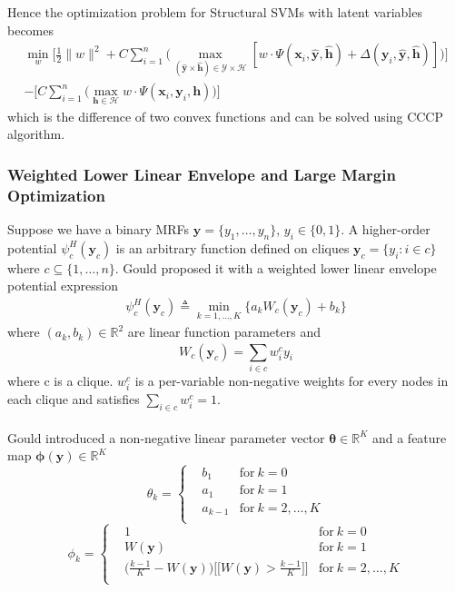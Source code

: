 \documentclass{article}
\begin{document}
		Hence the optimization problem for Structural SVMs with latent variables becomes
		\begin{align*}
			\min_w\bigg[\frac{1}{2}\|w\|^2+
			C\sum_{i=1}^{n}\big(\max_{(\mathbf{\hat{y}} \times \mathbf{\hat{h}}) \in \mathcal{Y} \times \mathcal{H}} [w\cdot\Psi(\mathbf{x}_i,\mathbf{\hat{y}},\mathbf{\hat{h}}) + \Delta(\mathbf{y}_i,\mathbf{\hat{y}},\mathbf{\hat{h}})]\big)\bigg]\\
			-\bigg[C\sum_{i=1}^{n}\big(\max_{\mathbf{h} \in \mathcal{H}} w \cdot \Psi(\mathbf{x}_i,\mathbf{y}_i,\mathbf{h})\big)\bigg]
		\end{align*}
		which is the difference of two convex functions and can be solved using CCCP\cite{yuille2002concave} algorithm.

		\subsubsection{Weighted Lower Linear Envelope and Large Margin Optimization}
		Suppose we have a binary MRFs $\mathbf{y}=\{y_1,\dots,y_n\}$, $y_i\in\{0,1\}$. A higher-order potential $\psi_c^H(\mathbf{y}_c)$ is an arbitrary function defined on cliques $\mathbf{y}_c=\{y_i : i\in c\}$ where $c\subseteq\{1,\dots,n\}$. Gould\cite{gouldlearning} proposed it with a weighted lower linear envelope potential expression
		\begin{align}
		\psi_c^H(\mathbf{y}_c) \triangleq \min_{k=1,\dots,K}\bigg\{a_kW_c(\mathbf{y}_c)+b_k\bigg\}
		\end{align}
		where $(a_k,b_k)\in\mathbb{R}^2$ are linear function parameters and
		$$
		W_c(\mathbf{y}_c) = \sum_{i\in c}^{}w_i^cy_i
		$$
		where c is a clique. $w_i^c$ is a per-variable non-negative weights for every nodes in each clique and satisfies $\sum_ {i\in c}^{}w_i^c=1$.\\\\
		Gould\cite{gouldlearning} introduced a non-negative linear parameter vector $\boldsymbol{\theta}\in\mathbb{R}^K$ and a feature map $\boldsymbol{\phi}(\mathbf{y})\in \mathbb{R}^K$ 
		\begin{equation*}
		\theta_k = \left\{
		\begin{aligned}
		& b_1	& \text{for} \ k=0\\
		& a_1 & \text{for}\ k=1\\
		& a_{k-1}  & \text{for} \ k=2,\dots,K\\
		\end{aligned}
		\right.
		\end{equation*}
		\begin{equation*}
		\phi_k = \left\{
		\begin{aligned}
		& 1	& \text{for} \ k=0\\
		& W(\mathbf{y}) & \text{for}\ k=1\\
		& \bigg(\frac{k-1}{K}-W(\mathbf{y}) \bigg)\bigg[\bigg[ W(\mathbf{y}) > \frac{k-1}{K}\bigg]\bigg]  & \text{for} \ k=2,\dots,K\\
		\end{aligned}
		\right.
		\end{equation*}
\end{document}
